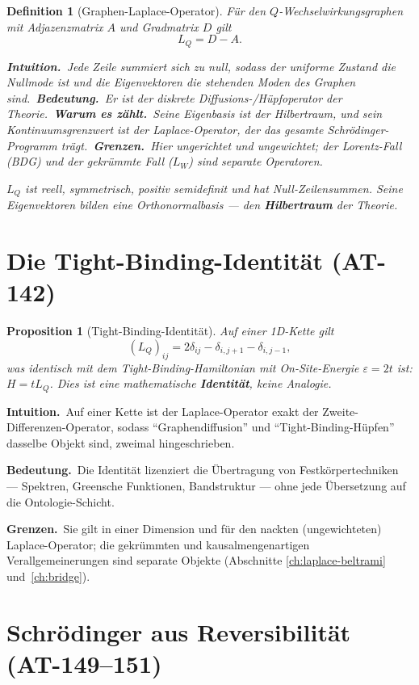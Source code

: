 \documentclass[10pt,twoside,openany]{book}
\newtheorem{proposition}[theorem]{Proposition}
\newtheorem{definition}[theorem]{Definition}
\newcommand{\theoremnotes}[3]{%
  \par\medskip\noindent
  \textbf{Intuition.}\ #1\par
  \textbf{Bedeutung.}\ #2\par
  \textbf{Grenzen.}\ #3\par}
\newcommand{\eqnotes}[4]{%
  \par\smallskip\noindent
  \textbf{Intuition.}\ #1\ 
  \textbf{Bedeutung.}\ #2\ 
  \textbf{Warum es zählt.}\ #3\ 
  \textbf{Grenzen.}\ #4\par}
\begin{document}
\begin{definition}[Graphen-Laplace-Operator]
Für den $Q$-Wechselwirkungsgraphen mit Adjazenzmatrix $A$ und Gradmatrix $D$ gilt
\begin{equation}
L_Q = D - A .
\end{equation}

\eqnotes
{Jede Zeile summiert sich zu null, sodass der uniforme Zustand die Nullmode ist und die
Eigenvektoren die stehenden Moden des Graphen sind.}
{Er ist der diskrete Diffusions-/Hüpfoperator der Theorie.}
{Seine Eigenbasis \emph{ist} der Hilbertraum, und sein Kontinuumsgrenzwert ist der
Laplace-Operator, der das gesamte Schr\"odinger-Programm trägt.}
{Hier ungerichtet und ungewichtet; der Lorentz-Fall (BDG) und der gekrümmte Fall ($L_W$)
sind separate Operatoren.}
$L_Q$ ist reell, symmetrisch, positiv semidefinit und hat Null-Zeilensummen. Seine
Eigenvektoren bilden eine Orthonormalbasis — den \textbf{Hilbertraum} der Theorie.
\end{definition}

\section{Die Tight-Binding-Identität (AT-142)}

\begin{proposition}[Tight-Binding-Identität]
Auf einer 1D-Kette gilt
\begin{equation}
(L_Q)_{ij} = 2\delta_{ij} - \delta_{i,j+1} - \delta_{i,j-1},
\end{equation}
was \emph{identisch} mit dem Tight-Binding-Hamiltonian mit On-Site-Energie
$\varepsilon=2t$ ist: $H = t L_Q$. Dies ist eine mathematische \textbf{Identität}, keine
Analogie.
\end{proposition}

\theoremnotes
{Auf einer Kette ist der Laplace-Operator exakt der Zweite-Differenzen-Operator, sodass
``Graphendiffusion'' und ``Tight-Binding-Hüpfen'' dasselbe Objekt sind, zweimal
hingeschrieben.}
{Die Identität lizenziert die Übertragung von Festkörpertechniken --- Spektren,
Greensche Funktionen, Bandstruktur --- ohne jede Übersetzung auf die Ontologie-Schicht.}
{Sie gilt in einer Dimension und für den nackten (ungewichteten) Laplace-Operator; die
gekrümmten und kausalmengenartigen Verallgemeinerungen sind separate Objekte (Abschnitte
\ref{ch:laplace-beltrami} und~\ref{ch:bridge}).}

\section{Schr\"odinger aus Reversibilität (AT-149--151)}
\end{document}

